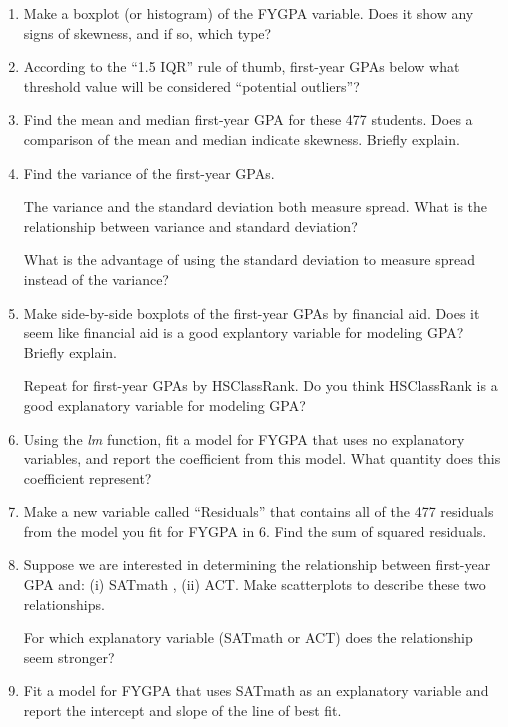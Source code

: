 \documentclass[12pt]{report}
\begin{document}
\begin{enumerate}
\item Make a boxplot (or histogram) of the FYGPA variable. Does it show any signs of skewness, and if so, which type?

\item According to the ``1.5 IQR'' rule of thumb, first-year GPAs below what threshold value will be considered ``potential outliers''?

\item Find the mean and median first-year GPA for these 477 students. Does a comparison of the mean and median indicate skewness. Briefly explain.

\item Find the variance of the first-year GPAs.

\noindent The variance and the standard deviation both measure spread. What is the relationship between variance and standard deviation?

\noindent What is the advantage of using the standard deviation to measure spread instead of the variance?

\item Make side-by-side boxplots of the first-year GPAs by financial aid. Does it seem like financial aid is a good explantory variable for modeling GPA? Briefly explain.

\noindent Repeat for first-year GPAs by HSClassRank. Do you think HSClassRank is a good explanatory variable for modeling GPA?

\item Using the \emph{lm} function, fit a model for FYGPA that uses no explanatory variables, and report the coefficient from this model. What quantity does this coefficient represent?

\item Make a new variable called ``Residuals'' that contains all of the 477 residuals from the model you fit for FYGPA in 6. Find the sum of squared residuals.

\item Suppose we are interested in determining the relationship between first-year GPA and: (i) SATmath , (ii) ACT. Make scatterplots to describe these two relationships.

\noindent For which explanatory variable (SATmath or ACT) does the relationship seem stronger?

\item Fit a model for FYGPA that uses SATmath as an explanatory variable and report the intercept and slope of the line of best fit.


\end{enumerate}
\end{document}
